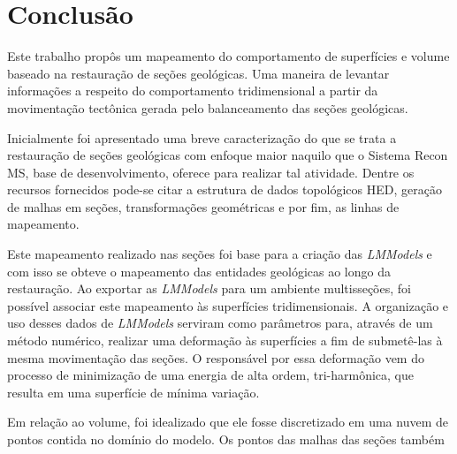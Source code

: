 
\chapter{Conclusão}

Este trabalho propôs um mapeamento do comportamento de superfícies e volume baseado na restauração de seções geológicas. Uma maneira de levantar informações a respeito do comportamento tridimensional a partir da movimentação tectônica gerada pelo balanceamento das seções geológicas.

Inicialmente foi apresentado uma breve caracterização do que se trata a restauração de seções geológicas com enfoque maior naquilo que o Sistema Recon MS, base de desenvolvimento, oferece para realizar tal atividade. Dentre os recursos fornecidos pode-se citar a estrutura de dados topológicos HED, geração de malhas em seções, transformações geométricas e por fim, as linhas de mapeamento.

Este mapeamento realizado nas seções foi base para a criação das \emph{LMModels} e com isso se obteve o mapeamento das entidades geológicas ao longo da restauração. Ao exportar as \emph{LMModels} para um ambiente multisseções, foi possível associar este mapeamento às superfícies tridimensionais. A organização e uso desses dados de \emph{LMModels} serviram como parâmetros para, através de um método numérico, realizar uma deformação às superfícies a fim de submetê-las à mesma movimentação das seções. O responsável por essa deformação vem do processo de minimização de uma energia de alta ordem, tri-harmônica, que resulta em uma superfície de mínima variação.

Em relação ao volume, foi idealizado que ele fosse discretizado em uma nuvem de pontos contida no domínio do modelo. Os pontos das malhas das seções também 

